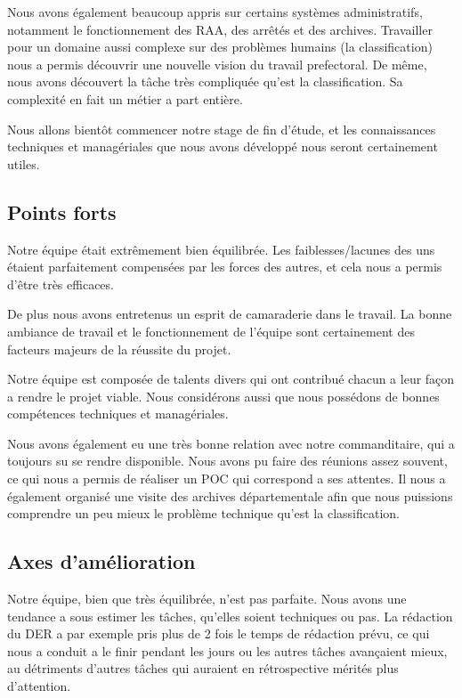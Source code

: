 Nous avons également beaucoup appris sur certains systèmes administratifs, notamment le fonctionnement des RAA, des arrêtés et des archives.
Travailler pour un domaine aussi complexe sur des problèmes humains (la classification) nous a permis découvrir une nouvelle vision du travail prefectoral.
De même, nous avons découvert la tâche très compliquée qu'est la classification.
Sa complexité en fait un métier a part entière.

Nous allons bientôt commencer notre stage de fin d'étude, et les connaissances techniques et managériales que nous avons développé nous seront certainement utiles.

\subsection{Points forts}
Notre équipe était extrêmement bien équilibrée.
Les faiblesses/lacunes des uns étaient parfaitement compensées par les forces des autres, et cela nous a permis d'être très efficaces.

De plus nous avons entretenus un esprit de camaraderie dans le travail.
La bonne ambiance de travail et le fonctionnement de l'équipe sont certainement des facteurs majeurs de la réussite du projet.

Notre équipe est composée de talents divers qui ont contribué chacun a leur façon a rendre le projet viable.
Nous considérons aussi que nous possédons de bonnes compétences techniques et managériales.

Nous avons également eu une très bonne relation avec notre commanditaire, qui a toujours su se rendre disponible.
Nous avons pu faire des réunions assez souvent, ce qui nous a permis de réaliser un POC qui correspond a ses attentes.
Il nous a également organisé une visite des archives départementale afin que nous puissions comprendre un peu mieux le problème technique qu'est la classification.


\subsection{Axes d'amélioration}
Notre équipe, bien que très équilibrée, n'est pas parfaite.
Nous avons une tendance a sous estimer les tâches, qu'elles soient techniques ou pas.
La rédaction du DER a par exemple pris plus de 2 fois le temps de rédaction prévu, ce qui nous a conduit a le finir pendant les jours ou les autres tâches avançaient mieux, au détriments d'autres tâches qui auraient en rétrospective mérités plus d'attention.

